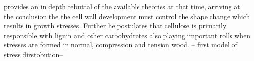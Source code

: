 \cite{ISI:A1950XU10300003} provides an in depth rebuttal of the available theories at that
time, arriving at the conclusion the the cell wall development must control the shape
change which results in growth stresses. Further he postulates that cellulose
is primarily responsible with lignin and other carbohydrates also playing important
rolls when stresses are formed in normal, compression and tension wood. 
--\cite{boyd1950a} first model of stress dirstobution--